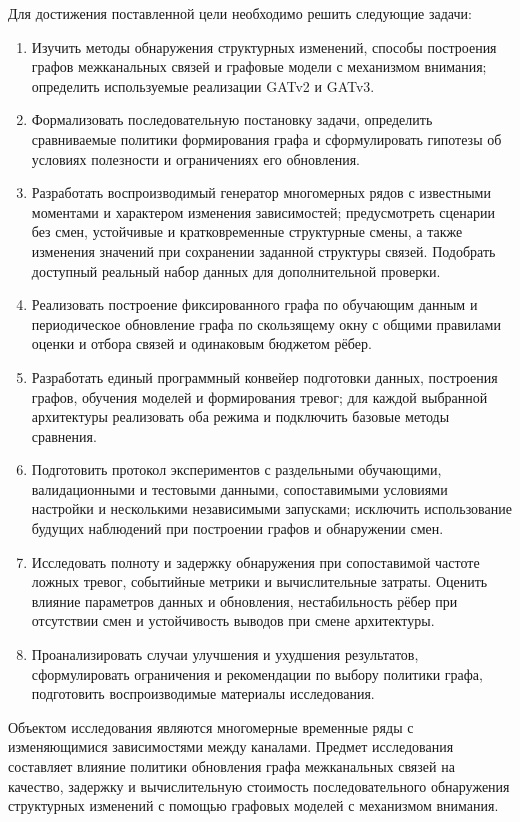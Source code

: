 \documentclass[bachelor, och, diploma]{SCWorks}
\begin{document}
Для достижения поставленной цели необходимо решить следующие задачи:
\begin{enumerate}
    \item Изучить методы обнаружения структурных изменений, способы построения графов межканальных связей и графовые модели с механизмом внимания; определить используемые реализации GATv2 и GATv3.
    \item Формализовать последовательную постановку задачи, определить сравниваемые политики формирования графа и сформулировать гипотезы об условиях полезности и ограничениях его обновления.
    \item Разработать воспроизводимый генератор многомерных рядов с известными моментами и характером изменения зависимостей; предусмотреть сценарии без смен, устойчивые и кратковременные структурные смены, а также изменения значений при сохранении заданной структуры связей. Подобрать доступный реальный набор данных для дополнительной проверки.
    \item Реализовать построение фиксированного графа по обучающим данным и периодическое обновление графа по скользящему окну с общими правилами оценки и отбора связей и одинаковым бюджетом рёбер.
    \item Разработать единый программный конвейер подготовки данных, построения графов, обучения моделей и формирования тревог; для каждой выбранной архитектуры реализовать оба режима и подключить базовые методы сравнения.
    \item Подготовить протокол экспериментов с раздельными обучающими, валидационными и тестовыми данными, сопоставимыми условиями настройки и несколькими независимыми запусками; исключить использование будущих наблюдений при построении графов и обнаружении смен.
    \item Исследовать полноту и задержку обнаружения при сопоставимой частоте ложных тревог, событийные метрики и вычислительные затраты. Оценить влияние параметров данных и обновления, нестабильность рёбер при отсутствии смен и устойчивость выводов при смене архитектуры.
    \item Проанализировать случаи улучшения и ухудшения результатов, сформулировать ограничения и рекомендации по выбору политики графа, подготовить воспроизводимые материалы исследования.
\end{enumerate}

Объектом исследования являются многомерные временные ряды с изменяющимися зависимостями между каналами. Предмет исследования составляет влияние политики обновления графа межканальных связей на качество, задержку и вычислительную стоимость последовательного обнаружения структурных изменений с помощью графовых моделей с механизмом внимания.
\end{document}
